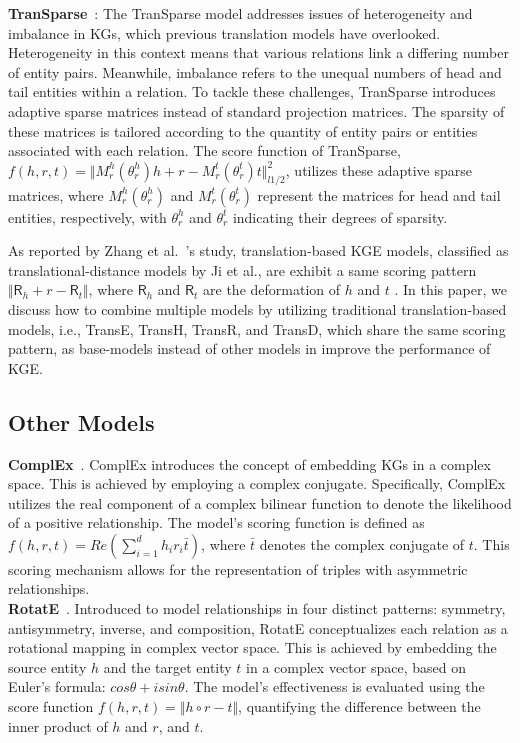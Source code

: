 \documentclass{article}
\begin{document}
\textbf{TranSparse}~\cite{ji2016knowledge}: The TranSparse model addresses issues of heterogeneity and imbalance in KGs, which previous translation models have overlooked. Heterogeneity in this context means that various relations link a differing number of entity pairs. Meanwhile, imbalance refers to the unequal numbers of head and tail entities within a relation. To tackle these challenges, TranSparse introduces adaptive sparse matrices instead of standard projection matrices. The sparsity of these matrices is tailored according to the quantity of entity pairs or entities associated with each relation. The score function of TranSparse, $f(h,r,t) = \Vert M^h_r (\theta^h_r)h + r - M^t_r (\theta^t_r)t\Vert_{l1/2}^2$, utilizes these adaptive sparse matrices, where $M^h_r (\theta^h_r)$ and $M^t_r (\theta^t_r)$ represent the matrices for head and tail entities, respectively, with $\theta^h_r$ and $\theta^t_r$ indicating their degrees of sparsity.

As reported by Zhang et al.~\cite{zhang-etal-2022-trans}'s study, translation-based KGE models, classified as translational-distance models by Ji et al.\cite{ji2021survey}, are exhibit a same scoring pattern $\Vert \mathsf{R}_h + r - \mathsf{R}_t \Vert$, where $\mathsf{R}_h$ and $\mathsf{R}_t$ are the deformation of $h$ and $t$ . In this paper, we discuss how to combine multiple models by utilizing traditional translation-based models, i.e., TransE, TransH, TransR, and TransD, which share the same scoring pattern, as base-models instead of other models in improve the performance of KGE.  
\subsection{Other Models}
\textbf{ComplEx}~\cite{trouillon2016complex}. ComplEx introduces the concept of embedding KGs in a complex space. This is achieved by employing a complex conjugate. Specifically, ComplEx utilizes the real component of a complex bilinear function to denote the likelihood of a positive relationship. The model's scoring function is defined as $f(h, r, t)=Re(\sum_{i=1}^dh_ir_i\bar{t})$, where $\bar{t}$ denotes the complex conjugate of $t$. This scoring mechanism allows for the representation of triples with asymmetric relationships.\\
\textbf{RotatE}~\cite{sun2019rotate}. Introduced to model relationships in four distinct patterns: symmetry, antisymmetry, inverse, and composition, RotatE conceptualizes each relation as a rotational mapping in complex vector space. This is achieved by embedding the source entity $h$ and the target entity $t$ in a complex vector space, based on Euler's formula: $cos\theta + i sin\theta$. The model's effectiveness is evaluated using the score function $f(h,r,t) = \Vert h \circ r - t \Vert$, quantifying the difference between the inner product of $h$ and $r$, and $t$.
\end{document}
